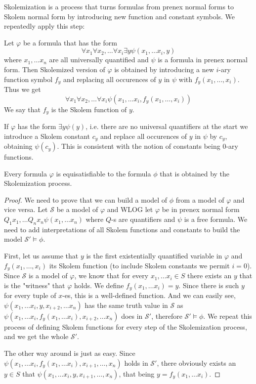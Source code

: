 Skolemization is a process that turns formulas from prenex normal forms to Skolem normal form by introducing new function and constant symbols. We repeatedly apply this step:

Let $\varphi$ be a formula that has the form $$\forall x_1\forall x_2,\dots \forall x_{i}\exists y\psi(x_1,\dots x_i,y)$$ where $x_1,\dots x_n$ are all universally quantified and $\psi$ is a formula in prenex normal form. Then Skolemized version of $\varphi$ is obtained by introducing a new $i$-ary function symbol $f_y$ and replacing all occurences of $y$ in $\psi$ with $f_y(x_1,\dots,x_i)$. Thus we get $$\forall x_1\forall x_2,\dots \forall x_{i}\psi(x_1,\dots x_i,f_y(x_1,\dots,x_i))$$ We say that $f_y$ is the Skolem function of $y$.

If $\varphi$ has the form $\exists y \psi(y)$, i.e. there are no universal quantifiers at the start we introduce a Skolem constant $c_y$ and replace all occurences of $y$ in $\psi$ by $c_y$, obtaining $\psi(c_y)$. This is consistent with the notion of constants being $0$-ary functions.

\begin{thm}
	Every formula $\varphi$ is equisatisfiable to the formula $\phi$ that is obtained by the Skolemization process.
\end{thm}
\begin{proof}
	We need to prove that we can build a model of $\phi$ from a model of $\varphi$ and vice versa. Let $\mathcal{S}$ be a model of $\varphi$ and WLOG let $\varphi$ be in prenex normal form $Q_1x_1,\dots Q_nx_n\psi(x_1,\dots x_n)$ where $Q$-s are quantifiers and $\psi$ is a free formula. We need to add interpretations of all Skolem functions and constants to build the model $\mathcal{S}'\models\phi$. 
	
First, let us assume that $y$ is the first existentially quantified variable in $\varphi$ and $f_y(x_1,\dots,x_i)$ its Skolem function (to include Skolem constants we permit $i=0$). Since $\mathcal{S}$ is a model of $\varphi$, we know that for every $x_1,\dots x_i\in S$ there exists an $y$ that is the "witness" that $\varphi$ holds. We define $f_y(x_1,\dots x_i)=y$. Since there is such $y$ for every tuple of $x$-es, this is a well-defined function. And we can easily see, $\psi(x_1,\dots x_i,y,x_{i+2},\dots x_n)$ has the same truth value in $\mathcal{S}$ as $\psi(x_1,\dots x_i,f_y(x_1,\dots x_i),x_{i+2},\dots x_n)$ does in $\mathcal{S}'$, therefore $\mathcal{S}'\models\phi$. We repeat this process of defining Skolem functions for every step of the Skolemization process, and we get the whole $\mathcal{S}'$.

The other way around is just as easy. Since $\psi(x_1,\dots x_i,f_y(x_1,\dots x_i), x_{i+1},\dots,x_n)$ holds in $\mathcal{S}'$, there obviously exists an $y\in S$ that $\psi(x_1,\dots x_i,y, x_{i+1},\dots,x_n)$, that being $y=f_y(x_1,\dots x_i)$.
\end{proof}

